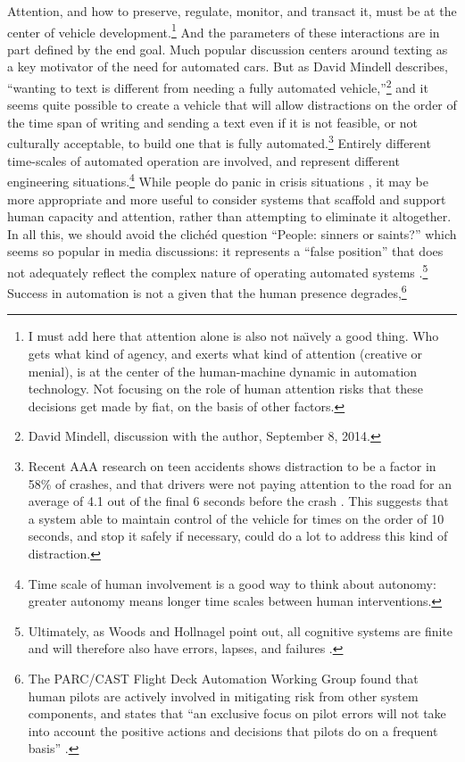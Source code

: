 Attention, and how to preserve, regulate, monitor, and transact it,
must be at the center of vehicle development.\footnote{I must add here
that attention alone is also not na\"{\i}vely a good thing. Who gets what
kind of agency, and exerts what kind of attention (creative or menial), is at the center of
the human-machine dynamic in automation technology. Not focusing on
the role of human attention risks that these decisions get made
by fiat, on the basis of other factors.} And the parameters of
these interactions are in part defined by the end goal. Much popular
discussion centers around texting as a key motivator of the need for
automated cars. But as 
David Mindell describes, ``wanting to text is different
from needing a fully automated vehicle,''\footnote{David Mindell,
  discussion with the author, September 8, 2014.} and it seems quite possible
to create a vehicle that will allow distractions on the order of the
time span of writing and sending a text even if it is not feasible, or
not culturally acceptable, to build one that is fully
automated.\footnote{Recent AAA research on teen accidents shows
  distraction to be a factor in 58\% of crashes, and that drivers were
not paying attention to the road for an average of 4.1 out of the
final 6 seconds before the crash \cite{greenDistraction}. This
suggests that a system able to 
maintain control of the vehicle for times on the order of 10 seconds,
and stop it safely if necessary, could do a lot to address this kind
of distraction.} Entirely different time-scales of automated operation
are involved, and represent different engineering
situations.\footnote{Time scale of human involvement is a good way to
  think about autonomy: greater autonomy means longer time scales
  between human interventions.} While
people do panic in crisis situations \cite{wiseFear},
it may be more appropriate and more useful to consider systems 
that scaffold and support human capacity and attention, rather than
attempting to eliminate it altogether. In
all this, we should avoid the clich\'{e}d question ``People: sinners
or saints?'' which seems so popular in media discussions: it represents
a ``false position'' that does not adequately reflect the complex
nature of operating automated
systems \cite[p. 1]{woodshollnagel}.\footnote{Ultimately, as Woods and
Hollnagel point out, all cognitive systems are finite and will
therefore also have errors, lapses, and
failures \cite[p. 1--2]{woodshollnagel}.} Success in automation is not
a given that the human presence degrades,\footnote{The PARC/CAST Flight Deck Automation Working Group
found that human pilots are actively involved in mitigating risk from
other system components, and states that ``an exclusive focus on pilot
errors will not take into account the positive actions and decisions
that pilots do on a frequent basis'' \cite[p. 30]{PARCCAST}.}
